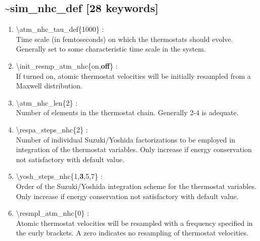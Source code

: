 \documentclass[12pt,titlepage]{article}
\begin{document}
\newpage
\subsection*{\bf \~{}sim\_nhc\_def [28 keywords]}

\begin{enumerate}
 \vspace{0.15in} 
 \item   \textbackslash atm\_nhc\_tau\_def\{1000\} : \\
  Time scale (in femtoseconds) on which the thermostats should evolve. 
  Generally set to some characteristic time scale in the system.

 \vspace{0.15in} 
 \item   \textbackslash init\_resmp\_atm\_nhc\{on,{\bf off}\} : \\
   If turned on, atomic thermostat velocities will be initially resampled from
   a Maxwell distribution.

 \vspace{0.15in} 
 \item   \textbackslash atm\_nhc\_len\{2\} : \\
   Number of elements in the thermostat chain.  Generally 2-4 is adequate.

 \vspace{0.15in}
 \item   \textbackslash respa\_steps\_nhc\{2\} : \\
     Number of individual Suzuki/Yoshida factorizations to be employed in
     integration of the thermostat variables.  Only
     increase if energy conservation not satisfactory with default value.

 \vspace{0.15in}
 \item   \textbackslash yosh\_steps\_nhc\{1,{\bf 3},5,7\} : \\
   Order of the Suzuki/Yoshida integration scheme for the thermostat
   variables.  Only increase if energy conservation not satisfactory with
   default value.

 \vspace{0.15in} 
 \item   \textbackslash resmpl\_atm\_nhc\{0\} : \\
   Atomic thermostat velocities will be resampled with a frequency specified
   in the curly brackets.  A zero indicates no resampling of thermostat
   velocities.


\end{enumerate}
\end{document}
